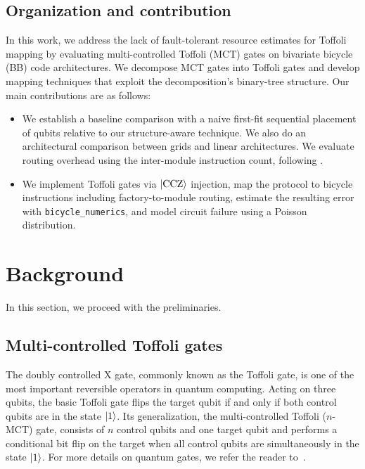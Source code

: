 \documentclass[sigconf]{acmart}
\newcommand{\anik}[1]{%
        \textcolor{blue}{\textbf{Anik:} #1}%
    }
\newcommand{\siyi}[1]{%
        \textcolor{cyan}{\textbf{Siyi:} #1}%
    }
\newcommand{\anik}[1]{}
\newcommand{\siyi}[1]{}
\begin{document}
\subsection{Organization and contribution}
\label{sub:org}
In this work, we address the lack of fault-tolerant resource estimates for Toffoli mapping by evaluating multi-controlled Toffoli (MCT) gates on bivariate bicycle (BB) code architectures. We decompose MCT gates into Toffoli gates and develop mapping techniques that exploit the decomposition's binary-tree structure. Our main contributions are as follows:
\begin{itemize}
    \item We establish a baseline comparison with a naive first-fit sequential placement of qubits relative to our structure-aware technique. We also do an architectural comparison between grids and linear architectures. We evaluate routing overhead using the inter-module instruction count, following \cite{sethi2026optimizing}. 
    
    \item We implement Toffoli gates via $\ket{\mathrm{CCZ}}$ injection, map the protocol to bicycle instructions including factory-to-module routing, estimate the resulting error with \texttt{bicycle\_numerics}, and model circuit failure using a Poisson distribution.
    \end{itemize}


%
\section{Background}
\label{sub:back}
In this section, we proceed with the preliminaries.
\subsection{Multi-controlled Toffoli gates}
The doubly controlled X gate, commonly known as the Toffoli gate, is one of the most important reversible operators in quantum computing. Acting on three qubits, the basic Toffoli gate flips the target qubit if and only if both control qubits are in the state $\ket{1}$. Its generalization, the multi-controlled Toffoli ($n$-MCT) gate, consists of $n$ control qubits and one target qubit and performs a conditional bit flip on the target when all control qubits are simultaneously in the state $\ket{1}$. For more details on quantum gates, we refer the reader to~\cite{nc}.
\end{document}
